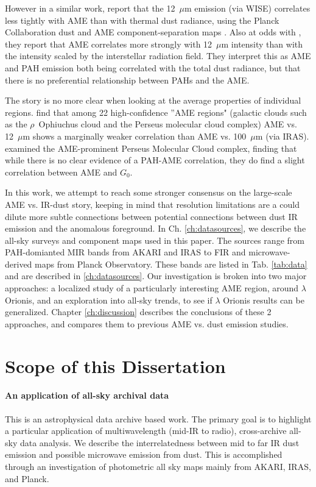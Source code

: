         However in a similar work, \cite{hensley16} report that the 12~$\mu$m emission (via WISE) correlates less tightly with AME than with thermal dust radiance, using the Planck Collaboration dust and AME component-separation maps \citep{planck15X}. Also at odds with \cite{ysard10b}, they report that AME correlates more strongly with 12~$\mu$m intensity than with the intensity scaled by the interstellar radiation field. They interpret this as AME and PAH emission both being correlated with the total dust radiance, but that there is no preferential relationship between PAHs and the AME.

       The story is no more clear when looking at the average properties of individual regions. \cite{planckXV} find that among 22 high-confidence ''AME regions" (galactic clouds such as the $\rho$~Ophiuchus cloud and the Perseus molecular cloud complex) AME vs. 12~$\mu$m  shows a marginally weaker correlation than AME vs. 100~$\mu$m (via IRAS). \cite{tibbs11} examined the AME-prominent Perseus Molecular Cloud complex, finding that while there is no clear evidence of a PAH-AME correlation, they do find a slight correlation between AME and  $G_0$.

       In this work, we attempt to reach some stronger consensus on the large-scale AME vs. IR-dust story, keeping in mind that resolution limitations are a could dilute more subtle connections between potential connections between dust IR emission and the anomalous foreground. In Ch. \hyperref[ch:datasources]{\ref*{ch:datasources}}, we describe the all-sky surveys and component maps used in this paper. The sources range from PAH-domianted MIR bands from AKARI and IRAS to FIR and microwave-derived maps from Planck Observatory. These bands are listed in Tab. \ref{tab:data} and are described in \ref{ch:datasources}. Our investigation is broken into two major approaches: a localized study of a particularly interesting AME region, around $\lambda$ Orionis, and an exploration into all-sky trends, to see if $\lambda$ Orionis results can be generalized. Chapter  \hyperref[ch:discussion]{\ref*{ch:discussion}} describes the conclusions of these 2 approaches, and compares them to previous AME vs. dust emission studies.

\section{Scope of this Dissertation}

  \paragraph{An application of all-sky archival data}
    This is an astrophysical data archive based work. The primary goal is to highlight a particular application of multiwavelength (mid-IR to radio), cross-archive all-sky data analysis. We describe the interrelatedness between mid to far IR dust emission and possible microwave emission from dust. This is accomplished through an investigation of photometric all sky maps mainly from AKARI, IRAS, and Planck.

